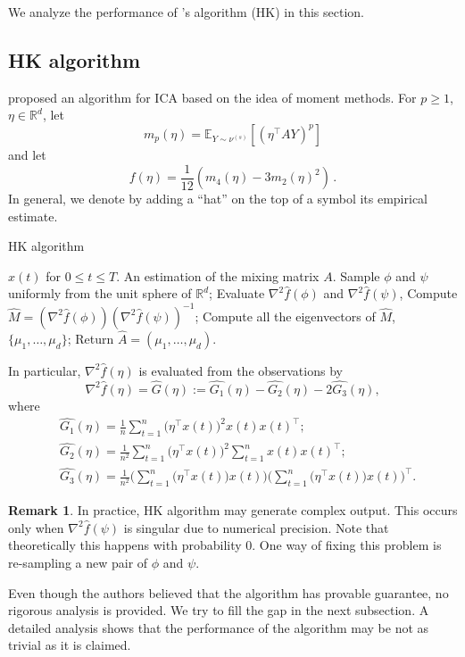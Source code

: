 \documentclass[twoside]{article}
\newcommand{\E}{\mathbb{E}}
\newcommand{\real}{\mathbb{R}}
\theoremstyle{definition}
\newtheorem{remark}[lemma]{Remark}
\begin{document}
We analyze the performance of \citet{hsu2013learning}'s algorithm (HK) in this section.

\subsection{HK algorithm}
\label{subsec:HKalg}
\citet{DHsu2012} proposed an algorithm for ICA based on the idea of moment methods.
For $p\ge 1$, $\eta\in \real^d$, 
let 
\begin{equation}
\label{eq:momnent}
m_p(\eta) = \E_{Y\sim \nu^{(s)}}[ (\eta^\top A Y)^p ]
\end{equation}
and let
\begin{equation}
\label{eq:funcf}
f(\eta) = \frac1{12} \left( m_4(\eta) - 3 m_2(\eta)^2 \right)\,.
\end{equation}
In general, we denote by adding a ``hat'' on the top of a symbol its empirical estimate.
\begin{algorithm}[H]
\caption{HK algorithm}
\begin{algorithmic}[1]
\INPUT $x(t)$ for $0\le t \le T$. 
\OUTPUT An estimation of the mixing matrix $A$. 
\STATE Sample $\phi$ and $\psi$ uniformly from the unit sphere of $\real^d$;
\STATE Evaluate $\nabla^2\widehat{f}(\phi)$ and $\nabla^2\widehat{f}(\psi)$, 
\STATE Compute $\widehat{M} = (\nabla^2 \widehat{f}(\phi))(\nabla^2\widehat{f}(\psi))^{-1}$;
\STATE Compute all the eigenvectors of $\widehat{M}$, $\{\mu_1,\ldots,\mu_d\}$;
\STATE Return $\widehat{A} = (\mu_1,\ldots,\mu_d)$.
\end{algorithmic}
\end{algorithm}
In particular, $\nabla^2\widehat{f}(\eta)$  is evaluated from the observations by
\begin{equation}
\label{eq:G}
\nabla^2 \widehat{f}(\eta) = \widehat{G}(\eta):= \widehat{G_1}(\eta) - \widehat{G_2}(\eta) -2\widehat{G_3}(\eta),
\end{equation}
where 
\begin{align*}
&\widehat{ G_1}(\eta) = \frac1n\sum_{t=1}^{n} \big(\eta^{\top}x(t)\big)^2x(t)x(t)^{\top}; \\
& \widehat{G_2}(\eta) = \frac{1}{n^2}\sum_{t=1}^{n} \big(\eta^{\top}x(t)\big)^2 \sum_{t=1}^{n}x(t)x(t)^{\top}; \\
& \widehat{G_3}(\eta) = \frac{1}{n^2}\Big(\sum_{t=1}^{n} \big(\eta^{\top}x(t)\big)x(t)\Big) \Big(\sum_{t=1}^{n} \big(\eta^{\top}x(t)\big)x(t)\Big)^{\top}.
\end{align*} 
\begin{remark}
In practice, HK algorithm may generate complex output. 
This occurs only when $\nabla^2\widehat{f}(\psi)$ is singular due to numerical precision. 
Note that theoretically this happens with probability 0. 
One way of fixing this problem is re-sampling a new pair of $\phi$ and $\psi$.
\end{remark}
Even though the authors believed that the algorithm has provable guarantee, no rigorous analysis is provided. 
We try to fill the gap in the next subsection. 
A detailed analysis shows that the performance of the algorithm may be not as trivial as it is claimed.
\end{document}
